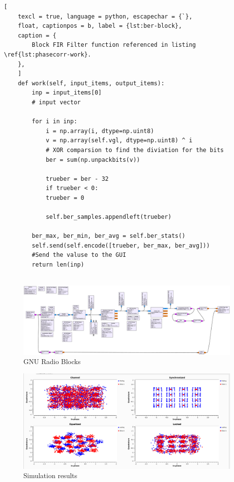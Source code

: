 


\begin{lstlisting}[
	texcl = true, language = python, escapechar = {`},
	float, captionpos = b, label = {lst:ber-block},
	caption = {
		Block FIR Filter function referenced in listing \ref{lst:phasecorr-work}.
	},
	]
	def work(self, input_items, output_items):
		inp = input_items[0]
		# input vector
	
		for i in inp:
			i = np.array(i, dtype=np.uint8)
			v = np.array(self.vgl, dtype=np.uint8) ^ i
			# XOR comparsion to find the diviation for the bits 
			ber = sum(np.unpackbits(v))
	
			trueber = ber - 32
			if trueber < 0:
			trueber = 0
	
			self.ber_samples.appendleft(trueber)

		ber_max, ber_min, ber_avg = self.ber_stats()
		self.send(self.encode([trueber, ber_max, ber_avg]))
		#Send the valuse to the GUI
		return len(inp)
	
\end{lstlisting}





\begin{figure}
	\includegraphics[width=\linewidth]{./figures/pdfs/qam_nogui.pdf}
	\caption{GNU Radio Blocks}
	\label{fig:simul16QAM_block}	
\end{figure}

\begin{figure}
	\includegraphics[width=\linewidth]{./figures/screenshots/QAM16_Fading_2.png}
	\caption{Simulation results}
	\label{fig:simul16QAM}	
\end{figure}

